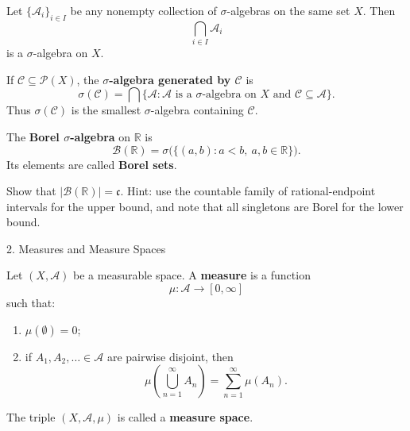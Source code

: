 \documentclass[12pt,a4paper]{article}
\begin{document}
\clearpage

\begin{theorem}
    Let $\{\mathcal{A}_i\}_{i\in I}$ be any nonempty collection of $\sigma$-algebras on the same set $X$. Then
    \[
        \bigcap_{i\in I}\mathcal{A}_i
    \]
    is a $\sigma$-algebra on $X$.
\end{theorem}

\clearpage

\begin{definition}
    If $\mathcal{C}\subseteq\mathcal{P}(X)$, the \textbf{$\sigma$-algebra generated by $\mathcal{C}$} is
    \[
        \sigma(\mathcal{C})
        =\bigcap\{\mathcal{A}:\mathcal{A}\text{ is a $\sigma$-algebra on }X
        \text{ and }\mathcal{C}\subseteq\mathcal{A}\}.
    \]
    Thus $\sigma(\mathcal{C})$ is the smallest $\sigma$-algebra containing $\mathcal{C}$.
\end{definition}

\clearpage

\begin{definition}
    The \textbf{Borel $\sigma$-algebra} on $\mathbb{R}$ is
    \[
        \mathcal{B}(\mathbb{R})
        =\sigma\bigl(\{(a,b):a<b,\ a,b\in\mathbb{R}\}\bigr).
    \]
    Its elements are called \textbf{Borel sets}.
\end{definition}

\clearpage

\begin{problem}
    Show that $|\mathcal{B}(\mathbb{R})|=\mathfrak{c}$. Hint: use the countable family of rational-endpoint intervals for the upper bound, and note that all singletons are Borel for the lower bound.
\end{problem}

\clearpage

\begin{heading}
    2. Measures and Measure Spaces
\end{heading}

\vspace{10pt}

\begin{definition}[Measure]
    Let $(X,\mathcal{A})$ be a measurable space. A \textbf{measure} is a function
    \[
        \mu:\mathcal{A}\longrightarrow[0,\infty]
    \]
    such that:
    \begin{enumerate}
        \item $\mu(\emptyset)=0$;
        \item if $A_1,A_2,\ldots\in\mathcal{A}$ are pairwise disjoint, then
        \[
            \mu\!\left(\bigcup_{n=1}^{\infty}A_n\right)
            =\sum_{n=1}^{\infty}\mu(A_n).
        \]
    \end{enumerate}
    The triple $(X,\mathcal{A},\mu)$ is called a \textbf{measure space}.
\end{definition}
\end{document}

